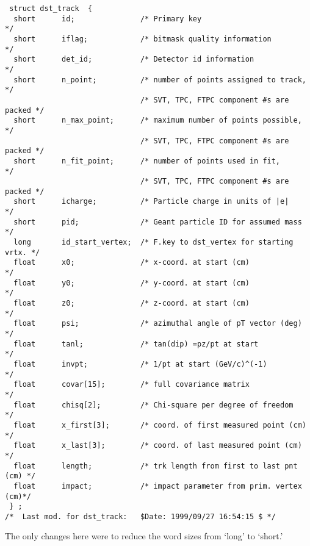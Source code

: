 \begin{verbatim}
 struct dst_track  {
  short      id;               /* Primary key                            */
  short      iflag;            /* bitmask quality information            */
  short      det_id;           /* Detector id information                */
  short      n_point;          /* number of points assigned to track,    */
                               /* SVT, TPC, FTPC component #s are packed */
  short      n_max_point;      /* maximum number of points possible,     */
                               /* SVT, TPC, FTPC component #s are packed */
  short      n_fit_point;      /* number of points used in fit,          */
                               /* SVT, TPC, FTPC component #s are packed */
  short      icharge;          /* Particle charge in units of |e|        */
  short      pid;              /* Geant particle ID for assumed mass     */
  long       id_start_vertex;  /* F.key to dst_vertex for starting vrtx. */
  float      x0;               /* x-coord. at start (cm)                 */
  float      y0;               /* y-coord. at start (cm)                 */
  float      z0;               /* z-coord. at start (cm)                 */
  float      psi;              /* azimuthal angle of pT vector (deg)     */
  float      tanl;             /* tan(dip) =pz/pt at start               */
  float      invpt;            /* 1/pt at start (GeV/c)^(-1)             */
  float      covar[15];        /* full covariance matrix                 */
  float      chisq[2];         /* Chi-square per degree of freedom       */
  float      x_first[3];       /* coord. of first measured point (cm)    */
  float      x_last[3];        /* coord. of last measured point (cm)     */
  float      length;           /* trk length from first to last pnt (cm) */
  float      impact;           /* impact parameter from prim. vertex (cm)*/
 } ;
/*  Last mod. for dst_track:   $Date: 1999/09/27 16:54:15 $ */

\end{verbatim}

\vspace{0.1in}
\vspace{0.05in}

The only changes here were to reduce the word sizes from `long' to `short.'

